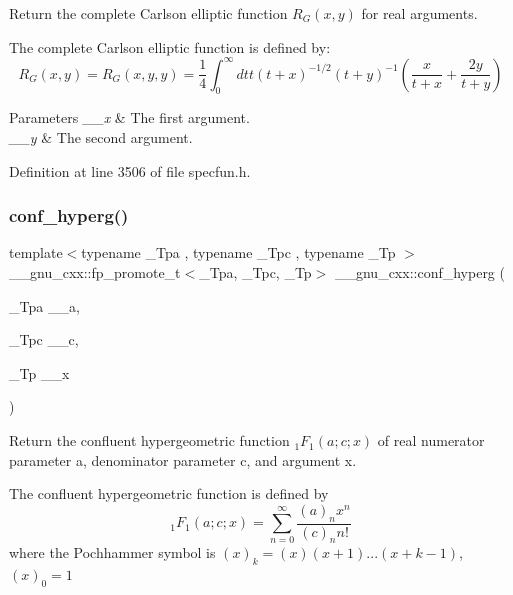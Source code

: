 Return the complete Carlson elliptic function $ R_G(x,y) $ for real arguments.

The complete Carlson elliptic function is defined by\+: \[ R_G(x,y) = R_G(x,y,y) = \frac{1}{4} \int_0^\infty dt t (t + x)^{-1/2}(t + y)^{-1} \left(\frac{x}{t + x} + \frac{2y}{t + y}\right) \]


\begin{DoxyParams}{Parameters}
{\em \+\_\+\+\_\+x} & The first argument. \\
\hline
{\em \+\_\+\+\_\+y} & The second argument. \\
\hline
\end{DoxyParams}


Definition at line 3506 of file specfun.\+h.

\mbox{\label{group__mathsf__gnu_ga4d01e85e7d295afca5d9f8b6c68f19cc}} 
\subsubsection{\texorpdfstring{conf\+\_\+hyperg()}{conf\_hyperg()}}
{\footnotesize\ttfamily template$<$typename \+\_\+\+Tpa , typename \+\_\+\+Tpc , typename \+\_\+\+Tp $>$ \\
\+\_\+\+\_\+gnu\+\_\+cxx\+::fp\+\_\+promote\+\_\+t$<$\+\_\+\+Tpa, \+\_\+\+Tpc, \+\_\+\+Tp$>$ \+\_\+\+\_\+gnu\+\_\+cxx\+::conf\+\_\+hyperg (\begin{DoxyParamCaption}\item[{\+\_\+\+Tpa}]{\+\_\+\+\_\+a,  }\item[{\+\_\+\+Tpc}]{\+\_\+\+\_\+c,  }\item[{\+\_\+\+Tp}]{\+\_\+\+\_\+x }\end{DoxyParamCaption})\hspace{0.3cm}{\ttfamily [inline]}}

Return the confluent hypergeometric function $ {}_1F_1(a;c;x) $ of real numerator parameter {\ttfamily a}, denominator parameter {\ttfamily c}, and argument {\ttfamily x}.

The confluent hypergeometric function is defined by \[ {}_1F_1(a;c;x) = \sum_{n=0}^{\infty} \frac{(a)_n x^n}{(c)_n n!} \] where the Pochhammer symbol is $ (x)_k = (x)(x+1)...(x+k-1) $, $ (x)_0 = 1 $


